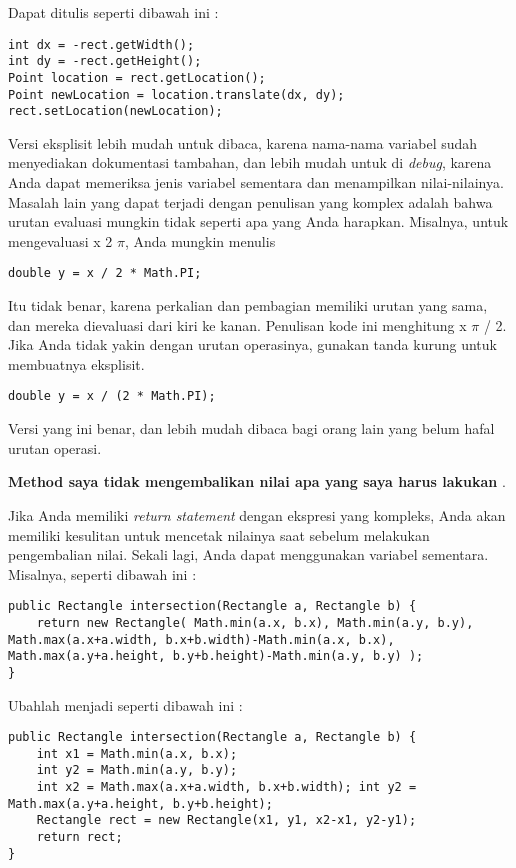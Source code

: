 \documentclass[12pt,b5paper,openright,twoside]{book}
\begin{document}
\noindent Dapat ditulis seperti dibawah ini : 
\begin{lstlisting}
int dx = -rect.getWidth(); 
int dy = -rect.getHeight(); 
Point location = rect.getLocation(); 
Point newLocation = location.translate(dx, dy); rect.setLocation(newLocation);
\end{lstlisting}

\noindent Versi eksplisit lebih mudah untuk dibaca, karena nama-nama variabel sudah menyediakan dokumentasi tambahan, dan lebih mudah untuk di \textit{debug}, karena Anda dapat memeriksa jenis variabel sementara dan menampilkan nilai-nilainya.
Masalah lain yang dapat terjadi dengan penulisan yang komplex adalah bahwa urutan evaluasi mungkin tidak seperti apa yang Anda harapkan. Misalnya, untuk mengevaluasi x 2 $\pi$, Anda mungkin menulis

\begin{lstlisting}
double y = x / 2 * Math.PI;
\end{lstlisting}

\noindent Itu tidak benar, karena perkalian dan pembagian memiliki urutan yang sama, dan mereka dievaluasi dari kiri ke kanan. Penulisan kode ini menghitung x $\pi$ / 2.
Jika Anda tidak yakin dengan urutan operasinya, gunakan tanda kurung untuk membuatnya eksplisit. 

\begin{lstlisting}
double y = x / (2 * Math.PI);
\end{lstlisting}

\noindent Versi yang ini benar, dan lebih mudah dibaca bagi orang lain yang belum hafal urutan operasi.

\noindent \textbf{Method saya tidak mengembalikan nilai apa yang saya harus lakukan} .

\noindent Jika Anda memiliki \textit{return statement} dengan ekspresi yang kompleks, Anda akan memiliki kesulitan untuk mencetak nilainya saat sebelum melakukan pengembalian nilai. Sekali lagi, Anda dapat menggunakan variabel sementara. Misalnya, seperti dibawah ini :
\begin{lstlisting}
public Rectangle intersection(Rectangle a, Rectangle b) { 
    return new Rectangle( Math.min(a.x, b.x), Math.min(a.y, b.y), Math.max(a.x+a.width, b.x+b.width)-Math.min(a.x, b.x), Math.max(a.y+a.height, b.y+b.height)-Math.min(a.y, b.y) ); 
}
\end{lstlisting}

\noindent Ubahlah menjadi seperti dibawah ini :
\begin{lstlisting}
public Rectangle intersection(Rectangle a, Rectangle b) { 
    int x1 = Math.min(a.x, b.x); 
    int y2 = Math.min(a.y, b.y); 
    int x2 = Math.max(a.x+a.width, b.x+b.width); int y2 = Math.max(a.y+a.height, b.y+b.height); 
    Rectangle rect = new Rectangle(x1, y1, x2-x1, y2-y1); 
    return rect; 
}
\end{lstlisting}
\end{document}
